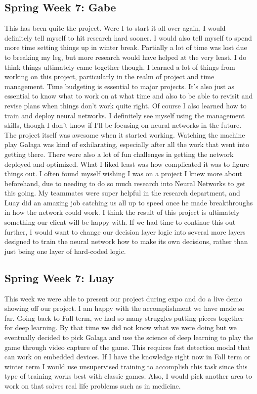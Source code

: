 \documentclass[onecolumn, draftclsnofoot,10pt, compsoc]{IEEEtran}
\begin{document}
\subsection{Spring Week 7: Gabe}
This has been quite the project. Were I to start it all over again, I would definitely tell myself to hit research hard sooner. I would also tell myself to spend more time setting things up in winter break. Partially a lot of time was lost due to breaking my leg, but more research would have helped at the very least. I do think things ultimately came together though. I learned a lot of things from working on this project, particularly in the realm of project and time management. Time budgeting is essential to major projects. It's also just as essential to know what to work on at what time and also to be able to revisit and revise plans when things don't work quite right. Of course I also learned how to train and deploy neural networks. I definitely see myself using the management skills, though I don't know if I'll be focusing on neural networks in the future.
\newline\newline
The project itself was awesome when it started working. Watching the machine play Galaga was kind of exhilarating, especially after all the work that went into getting there. There were also a lot of fun challenges in getting the network deployed and optimized. What I liked least was how complicated it was to figure things out. I often found myself wishing I was on a project I knew more about beforehand, due to needing to do so much research into Neural Networks to get this going. My teammates were super helpful in the research department, and Luay did an amazing job catching us all up to speed once he made breakthroughs in how the network could work. I think the result of this project is ultimately something our client will be happy with. If we had time to continue this out further, I would want to change our decision layer logic into several more layers designed to train the neural network how to make its own decisions, rather than just being one layer of hard-coded logic.
\subsection{Spring Week 7: Luay}
This week we were able to present our project during expo and do a live demo showing off our project. I am happy with the accomplishment we have made so far. Going back to Fall term, we had so many struggles putting pieces together for deep learning. By that time we did not know what we were doing but we eventually decided to pick Galaga and use the science of deep learning to play the game through video capture of the game. This requires fast detection modal that can work on embedded devices. If I have the knowledge right now in Fall term or winter term I would use unsupervised training to accomplish this task since this type of training works best with classic games. Also, I would pick another area to work on that solves real life problems such as in medicine.
\end{document}
